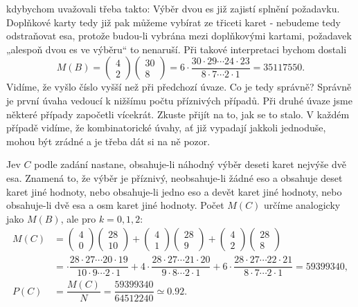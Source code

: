 \begin{example}
    kdybychom uvažovali třeba takto: Výběr dvou es již zajistí splnění požadavku. Doplňkové karty 
    tedy již pak můžeme vybírat ze třiceti karet - nebudeme tedy odstraňovat esa, protože budou-li 
    vybrána mezi doplňkovými kartami, požadavek „alespoň dvou es ve výběru“ to nenaruší. Při takové 
    interpretaci bychom dostali
    \begin{equation*}
      M(B) = \begin{pmatrix} 4 \\ 2\end{pmatrix}\begin{pmatrix} 30 \\ 8\end{pmatrix}   
           = 6\cdot\dfrac{30\cdot29\cdots24\cdot23}{8\cdot7\cdots2\cdot1}
           = \num{35117550}.
    \end{equation*}
    Vidíme, že vyšlo číslo vyšší než při předchozí úvaze. Co je tedy správně? Správně je první 
    úvaha vedoucí k nižšímu počtu příznivých případů. Při druhé úvaze jsme některé případy 
    započetli vícekrát. Zkuste přijít na to, jak se to stalo. V každém případě vidíme, že 
    kombinatorické úvahy, ať již vypadají jakkoli jednoduše, mohou být zrádné a je třeba dát si na 
    ně pozor. 
    
    Jev \(C\) podle zadání nastane, obsahuje-li náhodný výběr deseti karet nejvýše dvě esa. Znamená 
    to, že výběr je příznivý, neobsahuje-li žádné eso a obsahuje deset karet jiné hodnoty, nebo 
    obsahuje-li jedno eso a devět karet jiné hodnoty, nebo obsahuje-li dvě esa a osm karet jiné 
    hodnoty. Počet \(M(C)\) určíme analogicky jako \(M(B)\), ale pro \(k= 0, 1, 2\):
    \begin{align*}
      M(C) &=  \begin{pmatrix} 4 \\ 0\end{pmatrix}\begin{pmatrix} 28 \\ 10\end{pmatrix}
              +\begin{pmatrix} 4 \\ 1\end{pmatrix}\begin{pmatrix} 28 \\ 9\end{pmatrix}
              +\begin{pmatrix} 4 \\ 2\end{pmatrix}\begin{pmatrix} 28 \\ 8\end{pmatrix}         \\
           &=   \cdot\dfrac{28\cdot27\cdots20\cdot19}{10\cdot9\cdots2\cdot1}
              +4\cdot\dfrac{28\cdot27\cdots21\cdot20}{ 9\cdot8\cdots2\cdot1}
              +6\cdot\dfrac{28\cdot27\cdots22\cdot21}{ 8\cdot7\cdots2\cdot1} = \num{59399340}, \\
      P(C) &= \dfrac{M(C)}{N} = \dfrac{\num{59399340}}{\num{64512240}} \simeq\num{0.92}.
    \end{align*}
    

\end{example}
